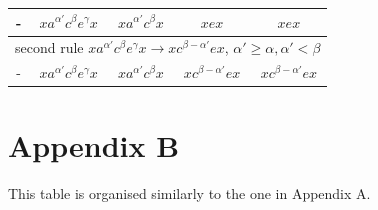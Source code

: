 \documentclass{article}
\theoremstyle{definition}
\begin{document}
\begin{center}
\begin{tabular}{|c|c|c|c|c|}
\hline
- &  $ x a^{\alpha'} c^\beta e^\gamma x $ &  $  x  a^{\alpha'} c^\beta   x $ &   $  x e x   $ &  $ x e x  $\\
\hline
\multicolumn{5}{|c|}{second rule $x a^{\alpha'} c^\beta e^\gamma x  \rightarrow x c^{\beta - \alpha'} e x $, $\alpha' \ge \alpha, \alpha' < \beta$}\\
\hline
- &  $ x a^{\alpha'} c^\beta e^\gamma x $ &  $  x  a^{\alpha'} c^\beta   x $ &   $  x c^{\beta - \alpha'} e x   $ &  $ x c^{\beta - \alpha'} e x  $\\
\hline
\end{tabular}
\end{center}

\section*{Appendix B}

This table is organised similarly to the one in Appendix A.
\end{document}
